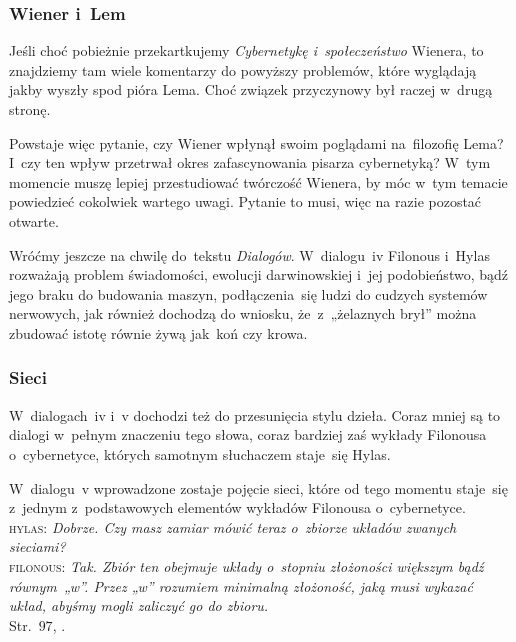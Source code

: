 \documentclass[10pt,t]{beamer}
\begin{document}
\begin{frame}
  \frametitle{Wiener i~Lem}


  Jeśli choć pobieżnie przekartkujemy \textit{Cybernetykę i~społeczeństwo}
  Wienera, to znajdziemy tam wiele komentarzy do powyższy problemów, które
  wyglądają jakby wyszły spod pióra Lema. Choć związek przyczynowy był
  raczej w~drugą stronę.

  Powstaje więc pytanie, czy Wiener wpłynął swoim poglądami na~filozofię
  Lema? I~czy ten wpływ przetrwał okres zafascynowania pisarza cybernetyką?
  W~tym momencie muszę lepiej przestudiować twórczość Wienera, by móc
  w~tym temacie powiedzieć cokolwiek wartego uwagi. Pytanie to musi, więc
  na razie pozostać otwarte.

  Wróćmy jeszcze na chwilę do~tekstu \textit{Dialogów}. W~dialogu~iv
  Filonous i~Hylas rozważają problem świadomości, ewolucji darwinowskiej
  i~jej podobieństwo, bądź jego braku do budowania maszyn, podłączenia~się
  ludzi do cudzych systemów nerwowych, jak również dochodzą
  do wniosku, że~z~„żelaznych brył” można zbudować istotę równie żywą
  jak~koń czy krowa.

\end{frame}





\begin{frame}
  \frametitle{Sieci}


  W~dialogach~iv i~v dochodzi też do przesunięcia stylu dzieła. Coraz mniej
  są to dialogi w~pełnym znaczeniu tego słowa, coraz bardziej zaś wykłady
  Filonousa o~cybernetyce, których samotnym słuchaczem staje~się Hylas.

  W~dialogu~v wprowadzone zostaje pojęcie sieci, które od tego momentu
  staje~się z~jednym z~podstawowych elementów wykładów Filonousa
  o~cybernetyce. \\
  \textsc{hylas}: \textit{Dobrze. Czy masz zamiar mówić teraz o~zbiorze
    układów zwanych sieciami?} \\
  \textsc{filonous}: \textit{Tak. Zbiór ten obejmuje układy o~stopniu
    złożoności większym bądź równym~„w”. Przez „w” rozumiem minimalną
    złożoność, jaką musi wykazać układ, abyśmy mogli zaliczyć go do
    zbioru.} \\
  Str.~$97$, \parencite{Lem-Dialogi-Vol-I-Pub-1996}.

\end{frame}
\end{document}
